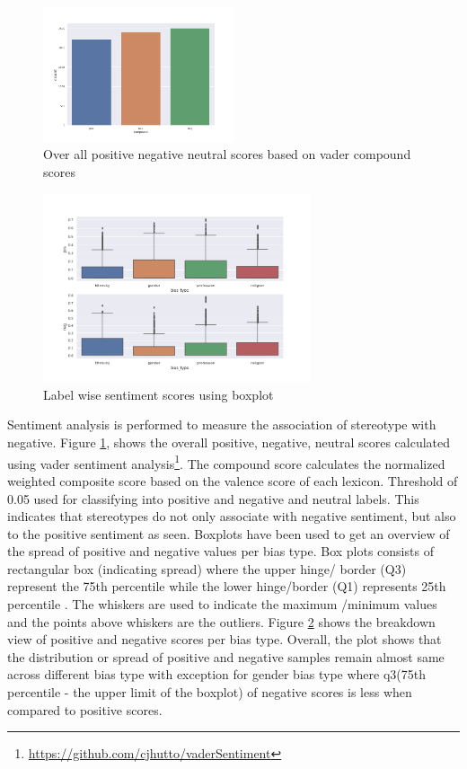 \begin{figure}[h]
    \centering
    \includegraphics[width=0.5\textwidth]{thesis/figures/sentiment_scores.png}
    \caption{Over all positive negative neutral scores based on vader compound scores}
    \label{fig:sentiment_scores}
\end{figure}

\begin{figure}[h]
    \centering
    \includegraphics[width=0.7\textwidth]{thesis/figures/sentiment_scores_boxplot.png}
    \caption{Label wise sentiment scores using boxplot}
    \label{fig:label_wise_sentiment}
\end{figure}

Sentiment analysis is performed to measure the association of stereotype with negative. Figure \ref{fig:sentiment_scores}, shows the overall positive, negative, neutral scores calculated using vader sentiment analysis\footnote{\url{https://github.com/cjhutto/vaderSentiment}}. The compound score calculates the normalized weighted composite score based on the valence score of each lexicon. Threshold of 0.05 used for classifying into positive and negative and neutral labels. This indicates that stereotypes do not only associate with negative sentiment, but also to the positive sentiment as seen. Boxplots have been used to get an overview of the spread of positive and negative values per bias type. Box plots consists of rectangular box (indicating spread) where the upper hinge/ border (Q3) represent the 75th percentile while the lower hinge/border (Q1) represents 25th percentile \cite{kurzl1988exploratory}. The whiskers are used to indicate the maximum /minimum values and the points above whiskers are the outliers. Figure \ref{fig:label_wise_sentiment} shows the breakdown view of positive and negative scores per bias type. Overall, the plot shows that the distribution or spread of positive and negative samples remain almost same across different bias type with exception for gender bias type where q3(75th percentile - the upper limit of the boxplot) of negative scores is less when compared to positive scores. 

